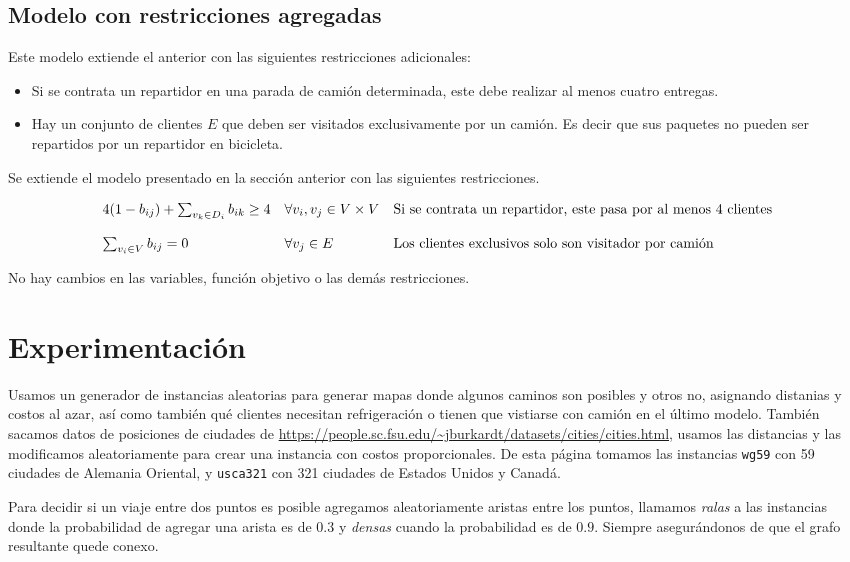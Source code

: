 \documentclass[10pt]{article}
\begin{document}
	\subsection{Modelo con restricciones agregadas}
	Este modelo extiende el anterior con las siguientes restricciones adicionales:
	\begin{itemize}
		\item Si se contrata un repartidor en una parada de camión determinada, este debe realizar al menos cuatro entregas.
		\item Hay un conjunto de clientes $E$ que deben ser visitados exclusivamente por un camión. Es decir que sus paquetes no pueden ser repartidos por un repartidor en bicicleta.
	\end{itemize}
	
	Se extiende el modelo presentado en la sección anterior con las siguientes restricciones.
	
		\[
	\begin{array}{l l l}
		4(1 - b_{ij}) + \sum_{v_k \in D_i} b_{ik} \geq 4 & \forall v_i, v_j \in V \times V & \text{Si se contrata un repartidor, este pasa por al menos 4 clientes} \\
		\\
		\sum_{v_i \in V}  b_{ij} = 0 & \forall v_j \in E  & \text{Los clientes exclusivos solo son visitador por camión} \\
	\end{array}
	\]
	
	No hay cambios en las variables, función objetivo o las demás restricciones.

	\section{Experimentación}

	Usamos un generador de instancias aleatorias para generar mapas donde algunos caminos son posibles y otros no, asignando distanias y costos al azar, así como también qué clientes necesitan refrigeración o tienen que vistiarse con camión en el último modelo. También sacamos datos de posiciones de ciudades de \url{https://people.sc.fsu.edu/~jburkardt/datasets/cities/cities.html}, usamos las distancias y las modificamos aleatoriamente para crear una instancia con costos proporcionales. De esta página tomamos las instancias \texttt{wg59} con 59 ciudades de Alemania Oriental, y \texttt{usca321} con 321 ciudades de Estados Unidos y Canadá.

	Para decidir si un viaje entre dos puntos es posible agregamos aleatoriamente aristas entre los puntos, llamamos \textit{ralas} a las instancias donde la probabilidad de agregar una arista es de $0.3$ y \textit{densas} cuando la probabilidad es de $0.9$. Siempre asegurándonos de que el grafo resultante quede conexo.
\end{document}
